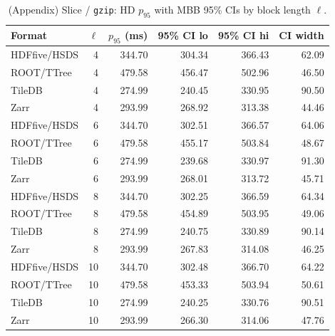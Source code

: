 \documentclass[nomenclature, english, bibtex]{kththesis}
\numberwithin{listing}{chapter}
\begin{document}
\begin{table}[H]
  \centering
  \caption*{(Appendix) Slice / \texttt{gzip}: \gls{HD} $p_{95}$ with \gls{MBB} 95\% \glspl{CI} by block length \(\ell\).}
  \begin{tabular}{l r r r r r}
    \toprule
    Format & \(\ell\) & $p_{95}$ (ms) & 95\% \gls{CI} lo & 95\% \gls{CI} hi & \gls{CI} width \\
    \midrule
    \gls{HDFfive}/\gls{HSDS} & 4  & 344.70 & 304.34 & 366.43 & 62.09 \\
    \gls{ROOT}/\gls{TTree} & 4  & 479.58 & 456.47 & 502.96 & 46.50 \\
    TileDB & 4 & 274.99 & 240.45 & 330.95 & 90.50 \\
    Zarr & 4  & 293.99 & 268.92 & 313.38 & 44.46 \\
    \gls{HDFfive}/\gls{HSDS} & 6  & 344.70 & 302.51 & 366.57 & 64.06 \\
    \gls{ROOT}/\gls{TTree} & 6  & 479.58 & 455.17 & 503.84 & 48.67 \\
    TileDB & 6 & 274.99 & 239.68 & 330.97 & 91.30 \\
    Zarr & 6  & 293.99 & 268.01 & 313.72 & 45.71 \\
    \gls{HDFfive}/\gls{HSDS} & 8  & 344.70 & 302.25 & 366.59 & 64.34 \\
    \gls{ROOT}/\gls{TTree} & 8  & 479.58 & 454.89 & 503.95 & 49.06 \\
    TileDB & 8 & 274.99 & 240.75 & 330.89 & 90.14 \\
    Zarr & 8  & 293.99 & 267.83 & 314.08 & 46.25 \\
    \gls{HDFfive}/\gls{HSDS} & 10 & 344.70 & 302.48 & 366.70 & 64.22 \\
    \gls{ROOT}/\gls{TTree} & 10 & 479.58 & 453.33 & 503.94 & 50.61 \\
    TileDB & 10& 274.99 & 240.25 & 330.76 & 90.51 \\
    Zarr & 10 & 293.99 & 266.30 & 314.06 & 47.76 \\
    \bottomrule
  \end{tabular}
\end{table}
\end{document}
